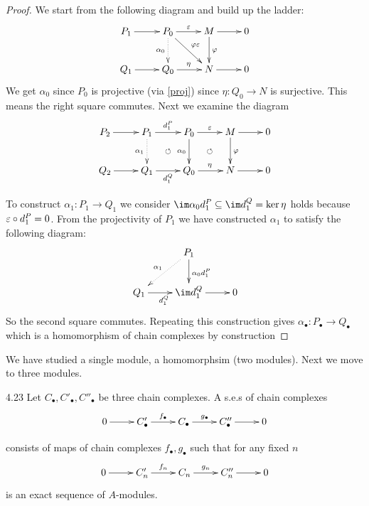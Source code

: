 \documentclass[twoside = false,	%
		headsepline,		%
		parskip = true,
		]{scrbook}						%
\begin{document}
    \begin{proof}
        We start from the following diagram and build up the ladder:
        \begin{equation*}
        \xymatrix {
            P_1 \ar[r] & P_0 \ar[r]^{\e} \ar[dr]^{\varphi \e} \ar@{.>}[d]_{\alpha_0} & M \ar[r] \ar[d]^{\varphi} & 0 \\
            Q_1 \ar[r] & Q_0 \ar[r]^{\eta} & N \ar[r]& 0
        }
        \end{equation*}
        We get $\alpha_0$ since $P_0$ is projective (via \eqref{proj}) since $\eta: Q_0 \to N$ is surjective. This means the right square commutes. Next we examine the diagram
        \begin{equation*}
        \xymatrix {
            P_2 \ar[r] & P_1 \ar[r]^{d_1^P} \ar@{.>}[d]_{\alpha_1} & P_0 \ar[r]^{\e} \ar[d]_{\alpha_0} & M \ar[r] \ar[d]^{\varphi} & 0 \\
            Q_2 \ar[r] & Q_1 \ar[r]_{d_1^Q} \ar@{}[ur]|{\circlearrowleft} & Q_0 \ar[r]^{\eta} \ar@{}[ur]|{\circlearrowleft} & N \ar[r]& 0
        }
        \end{equation*}

        To construct $\alpha_1: P_1 \to Q_1$ we consider $\im \alpha_0 d_1^P \subseteq \im d_1^Q = \ker \eta$ holds because $\varepsilon \circ d_1^P = 0$. From the projectivity of $P_1$ we have constructed $\alpha_1$ to satisfy the following diagram:
        \begin{equation*}
        \xymatrix {
            & P_1 \ar@{.>}[dl]_{\alpha_1} \ar[d]^{\alpha_0 d_1^P} \\
            Q_1 \ar[r]_{d_1^Q}& \im d_1^Q \ar[r] & 0
        }
        \end{equation*}
        So the second square commutes. Repeating this construction gives $\alpha_\bullet: P_\bullet \to Q_\bullet$ which is a homomorphism of chain complexes by construction
    \end{proof}

    We have studied a single module, a homomorphsim (two modules). Next we move to three modules.

    \begin{definition}{}{4.23}
        Let $C_\bullet,C'_\bullet,C''_\bullet$ be three chain complexes. A s.e.s of chain complexes
        \begin{equation*}
        \xymatrix {
            0 \ar[r] & C'_\bullet \ar[r]^{f_\bullet} & C_\bullet \ar[r]^{g_\bullet} & C''_\bullet \ar[r] & 0
        }
        \end{equation*}
        
        consists of maps of chain complexes $f_\bullet, g_\bullet$ such that for any fixed $n$
        \begin{equation*}
        \xymatrix {
            0 \ar[r] & C'_n \ar[r]^{f_n} & C_n \ar[r]^{g_n} & C''_n \ar[r] & 0
        }
        \end{equation*}
        is an exact sequence of $A$-modules.
    \end{definition}
    
\end{document}
